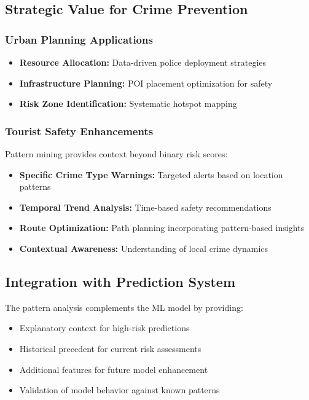 \documentclass[11pt]{article}
\begin{document}
\subsection{Strategic Value for Crime Prevention}

\subsubsection{Urban Planning Applications}
\begin{itemize}[leftmargin=*]
\item \textbf{Resource Allocation:} Data-driven police deployment strategies
\item \textbf{Infrastructure Planning:} POI placement optimization for safety
\item \textbf{Risk Zone Identification:} Systematic hotspot mapping
\end{itemize}

\subsubsection{Tourist Safety Enhancements}
Pattern mining provides context beyond binary risk scores:
\begin{itemize}[leftmargin=*]
\item \textbf{Specific Crime Type Warnings:} Targeted alerts based on location patterns
\item \textbf{Temporal Trend Analysis:} Time-based safety recommendations
\item \textbf{Route Optimization:} Path planning incorporating pattern-based insights
\item \textbf{Contextual Awareness:} Understanding of local crime dynamics
\end{itemize}

\subsection{Integration with Prediction System}
The pattern analysis complements the ML model by providing:
\begin{itemize}[leftmargin=*]
\item Explanatory context for high-risk predictions
\item Historical precedent for current risk assessments
\item Additional features for future model enhancement
\item Validation of model behavior against known patterns
\end{itemize}
\end{document}
